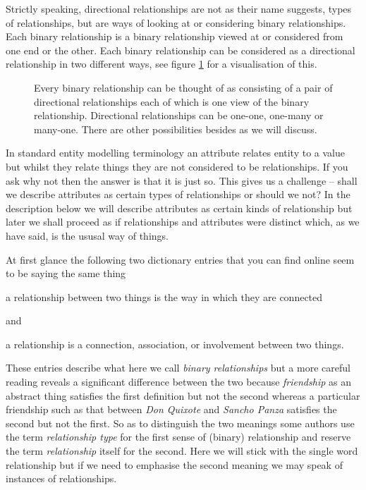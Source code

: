 \mynote Strictly speaking, directional relationships are not as their name suggests, types of relationships, but are ways of looking at or considering binary relationships. Each binary relationship is a binary relationship viewed at or considered from one end or the other. Each binary relationship can be considered as a directional relationship in two different ways, see figure \ref{relationshipTerminology} for a visualisation of this.

\begin{figure}
\label{relationshipTerminology}

\caption{Every binary relationship can be thought of as consisting of a pair of directional relationships each of which is one view of the binary relationship. Directional relationships can be one-one, one-many or many-one. There are other possibilities besides as we will discuss.  }
\end{figure}

\mynote
In standard entity modelling terminology an attribute relates entity to a value but whilst they relate things they are not considered to be relationships. If you ask why not then the answer is that it is just so.
This gives us a challenge -- shall we describe attributes as certain types of relationships or should we not?
In the description below we will describe attributes as certain kinds of relationship but later we shall 
proceed as if relationships and attributes were distinct which, as we have said, is the ususal way of things. 

\mynote 
At first glance the following two dictionary entries that you can find online seem to be saying the same thing
\begin{erquote}
a relationship between two things is the way in which they are connected
\end{erquote}
and 
\begin{erquote}
a relationship is a connection, association, or involvement between two things.
\end{erquote}
These entries describe what here we call \textit{binary relationships} but
a more careful reading reveals a significant difference between the two because \textit{friendship} as an abstract thing satisfies the first definition but not the second whereas a particular friendship such as that between \textit{Don Quixote} and \textit{Sancho Panza} satisfies the second  but not the first. 
So as to distinguish the two meanings some authors use the term \textit{relationship type} for the first sense of (binary) relationship and reserve the term \textit{relationship} itself for the second. Here we will stick with the single word relationship but if we need to emphasise the second meaning we may speak of instances of relationships. 

